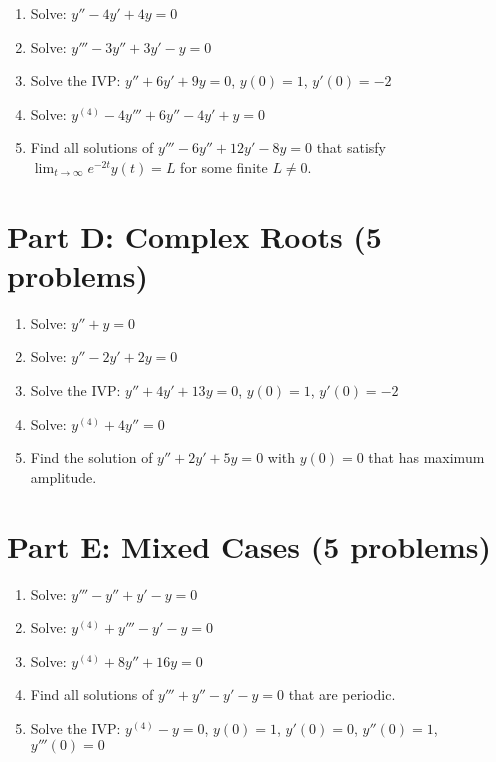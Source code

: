 \documentclass[12pt]{article}
\begin{document}
\begin{enumerate}[resume]
\item Solve: $y'' - 4y' + 4y = 0$

\item Solve: $y''' - 3y'' + 3y' - y = 0$

\item Solve the IVP: $y'' + 6y' + 9y = 0$, $y(0) = 1$, $y'(0) = -2$

\item Solve: $y^{(4)} - 4y''' + 6y'' - 4y' + y = 0$

\item Find all solutions of $y''' - 6y'' + 12y' - 8y = 0$ that satisfy $\lim_{t \to \infty} e^{-2t}y(t) = L$ for some finite $L \neq 0$.
\end{enumerate}

\section*{Part D: Complex Roots (5 problems)}

\begin{enumerate}[resume]
\item Solve: $y'' + y = 0$

\item Solve: $y'' - 2y' + 2y = 0$

\item Solve the IVP: $y'' + 4y' + 13y = 0$, $y(0) = 1$, $y'(0) = -2$

\item Solve: $y^{(4)} + 4y'' = 0$

\item Find the solution of $y'' + 2y' + 5y = 0$ with $y(0) = 0$ that has maximum amplitude.
\end{enumerate}

\section*{Part E: Mixed Cases (5 problems)}

\begin{enumerate}[resume]
\item Solve: $y''' - y'' + y' - y = 0$

\item Solve: $y^{(4)} + y''' - y' - y = 0$

\item Solve: $y^{(4)} + 8y'' + 16y = 0$

\item Find all solutions of $y''' + y'' - y' - y = 0$ that are periodic.

\item Solve the IVP: $y^{(4)} - y = 0$, $y(0) = 1$, $y'(0) = 0$, $y''(0) = 1$, $y'''(0) = 0$
\end{enumerate}
\end{document}

